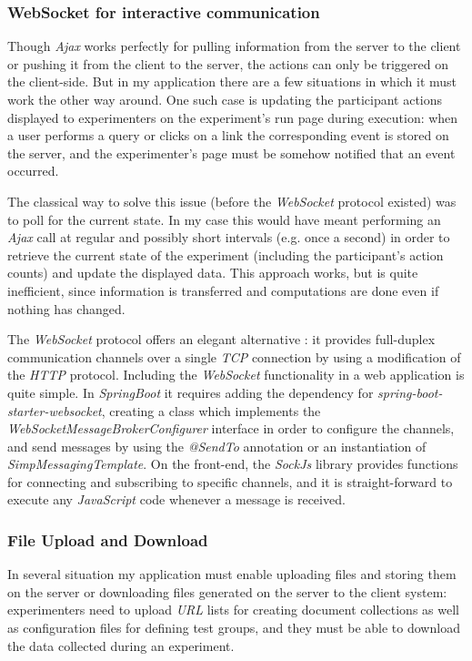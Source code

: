 \documentclass[a4paper]{usiinfbachelorproject}
\begin{document}
\subsubsection{\textbf{WebSocket for interactive communication}}

Though \emph{Ajax} works perfectly for pulling information from the server to the client or pushing it from the 
client to the server, the actions can only be triggered on the client-side. But in my application there
are a few situations in which it must work the other way around. One such case is updating the participant actions displayed to
experimenters on the experiment's run page during execution: when a user performs a query or clicks on a link 
the corresponding event is stored on the server, and the experimenter's page must be somehow notified that an event occurred.

The classical way to solve this issue (before the \emph{WebSocket} protocol existed) was to poll for the
current state. In my case this would have meant performing an \emph{Ajax} call at regular and possibly short intervals 
(e.g. once a second) in order to retrieve the current state of the experiment (including the participant's action counts)
and update the displayed data.
This approach works, but is quite inefficient, since information is transferred and computations are done even if nothing
has changed.

The \emph{WebSocket} protocol offers an elegant alternative \cite{websocketWikipedia}: it provides full-duplex communication channels
over a single \emph{TCP} connection by using a modification of the \emph{HTTP} protocol. Including the \emph{WebSocket} functionality
in a web application is quite simple. In \emph{SpringBoot} it requires adding the dependency for \emph{spring-boot-starter-websocket},
creating a class which implements the \emph{WebSocketMessageBrokerConfigurer} interface in order to configure the channels, and
send messages by using the \emph{@SendTo} annotation or an instantiation of \emph{SimpMessagingTemplate}.
On the front-end, the \emph{SockJs} library provides functions for connecting and subscribing to specific channels, and it is 
straight-forward to execute any \emph{JavaScript} code whenever a message is received.  


\subsubsection{\textbf{File Upload and Download}}

In several situation my application must enable uploading files and storing them on the server or downloading files 
generated on the server to the client system: experimenters need to upload \emph{URL} lists for creating document collections as well as 
configuration files for defining test groups, and they must be able to download the data collected during an experiment.
\end{document}
